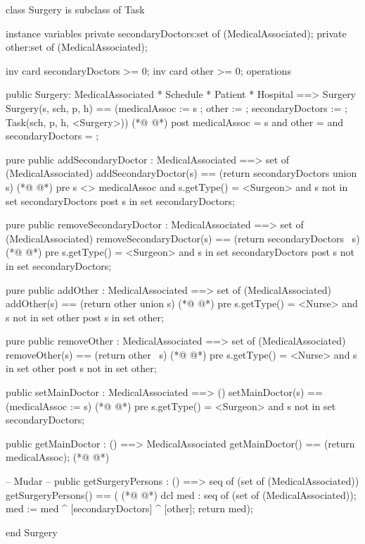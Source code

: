 \begin{vdmpp}[breaklines=true]
class Surgery is subclass of Task

instance variables
  private secondaryDoctors:set of (MedicalAssociated);
  private other:set of (MedicalAssociated);
  
  inv card secondaryDoctors >= 0;
  inv card other >= 0;
operations

 public Surgery: MedicalAssociated * Schedule * Patient * Hospital ==> Surgery
  Surgery(s, sch, p, h) == (medicalAssoc := s ; other := {}; secondaryDoctors := {}; Task(sch, p, h, <Surgery>))
(*@
\label{Surgery:13}
@*)
 post medicalAssoc = s and other = {} and secondaryDoctors = {};
 
 pure public addSecondaryDoctor : MedicalAssociated ==> set of (MedicalAssociated)
  addSecondaryDoctor(s) == (return secondaryDoctors union {s})
(*@
\label{addSecondaryDoctor:17}
@*)
 pre s <> medicalAssoc and s.getType() = <Surgeon> and  s not in set secondaryDoctors
 post s in set secondaryDoctors;
  
 pure public removeSecondaryDoctor : MedicalAssociated ==> set of (MedicalAssociated)
  removeSecondaryDoctor(s) == (return secondaryDoctors \ {s})
(*@
\label{removeSecondaryDoctor:22}
@*)
 pre s.getType() = <Surgeon> and s in set secondaryDoctors
 post s not in set secondaryDoctors;
  
 pure public addOther : MedicalAssociated ==> set of (MedicalAssociated)
  addOther(s) == (return other union {s})
(*@
\label{addOther:27}
@*)
 pre s.getType() = <Nurse> and s not in set other
 post s in set other;
  
 pure public removeOther : MedicalAssociated ==> set of (MedicalAssociated)
  removeOther(s) == (return other \ {s})
(*@
\label{removeOther:32}
@*)
 pre s.getType() = <Nurse> and s in set other
 post s not in set other;
  
 public setMainDoctor : MedicalAssociated ==> ()
  setMainDoctor(s) == (medicalAssoc := s)
(*@
\label{setMainDoctor:37}
@*)
 pre s.getType() = <Surgeon> and s not in set secondaryDoctors;
 
 public getMainDoctor : () ==> MedicalAssociated
  getMainDoctor() == (return medicalAssoc);
(*@
\label{getMainDoctor:41}
@*)
 
 -- Mudar -- 
 public getSurgeryPersons : () ==> seq of (set of (MedicalAssociated))
  getSurgeryPersons() == (
(*@
\label{getSurgeryPersons:45}
@*)
               dcl med : seq of (set of (MedicalAssociated));
               med := med ^ [secondaryDoctors] ^ [other];
               return med);

end Surgery
\end{vdmpp}

